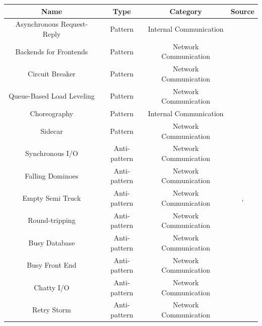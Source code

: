 \documentclass[a4paper,UKenglish]{dagrep}
\begin{document}
\begin{table}[H]
	\begin{tabular}{c|ccc}
		Name                       & Type    & Category           & Source                                    \\\hline
		Asynchronous Request-Reply & Pattern & Internal Communication      & \cite{microsoft2024performanceefficiency} \\
		Backends for Frontends     & Pattern & Network Communication      & \cite{microsoft2024performanceefficiency} \\
		Circuit Breaker            & Pattern & Network Communication      & \cite{microsoft2024performanceefficiency} \\
		Queue-Based Load Leveling  & Pattern & Network Communication      & \cite{microsoft2024performanceefficiency} \\
		Choreography               & Pattern & Internal Communication      & \cite{microsoft2024performanceefficiency} \\
		Sidecar                    & Pattern & Network Communication      & \cite{microsoft2024performanceefficiency} \\
		Synchronous I/O                   & Anti-pattern & Network Communication      & \cite{MicrosoftAntipatterns}                            \\
		Falling Dominoes                  & Anti-pattern & Network Communication      & \cite{more_se_antipatterns}                             \\
		Empty Semi Truck                  & Anti-pattern & Network Communication      & \cite{more_se_antipatterns},\cite{detect_antipatterns}  \\
		Round-tripping                    & Anti-pattern & Network Communication      & \cite{tate2002bitter}                                   \\
		Busy Database                     & Anti-pattern & Network Communication      & \cite{MicrosoftAntipatterns}                            \\
		Busy Front End                    & Anti-pattern & Network Communication      & \cite{MicrosoftAntipatterns}                            \\
		Chatty I/O                        & Anti-pattern & Network Communication      & \cite{MicrosoftAntipatterns}                            \\
		Retry Storm                       & Anti-pattern & Network Communication      & \cite{MicrosoftAntipatterns}                            \\

\end{tabular}
\end{table}
\end{document}
